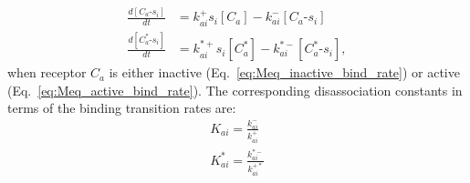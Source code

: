 \documentclass[9pt,twoside]{pnas-new}
\begin{document}
\begin{align}
\frac{d[C_a\text{-}s_i]}{dt} &= k^+_{ai}s_i[C_a] - k^-_{ai}[C_a\text{-}s_i] \label{eq:Meq_inactive_bind_rate}\\
\frac{d[C^*_a\text{-}s_i]}{dt} &= k^{*+}_{ai}s_i[C^*_a] - k^{*-}_{ai}[C^*_a\text{-}s_i],
\label{eq:Meq_active_bind_rate}
\end{align}
when receptor $C_a$ is either inactive (Eq.~\ref{eq:Meq_inactive_bind_rate}) or active (Eq.~\ref{eq:Meq_active_bind_rate}). The corresponding disassociation constants in terms of the binding transition rates are:
\begin{align}
K_{ai} = \frac{k^-_{ai}}{k^+_{ai}} \nonumber \\
K^*_{ai} = \frac{k^{*-}_{ai}}{k^{+*}_{ai}} 
\label{eq:Kd}
\end{align}
\end{document}
